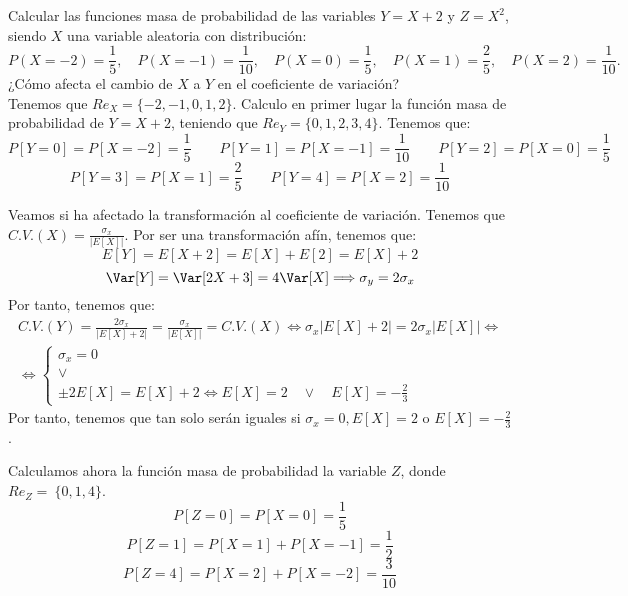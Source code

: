\begin{ejercicio}
    Calcular las funciones masa de probabilidad de las variables $Y = X + 2$ y $Z = X^2$, siendo $X$ una variable aleatoria con distribución:
    \begin{equation*}
        P(X=-2)=\frac{1}{5},\quad P(X=-1)=\frac{1}{10},\quad P(X=0)=\frac{1}{5}, \quad P(X=1)=\frac{2}{5}, \quad P(X=2)=\frac{1}{10}.
    \end{equation*}
    ¿Cómo afecta el cambio de $X$ a $Y$ en el coeficiente de variación?\\
    Tenemos que $Re_X=\{-2,-1,0,1,2\}$. Calculo en primer lugar la función masa de probabilidad de $Y=X+2$, teniendo que $Re_Y=\{0,1,2,3,4\}$. Tenemos que:
    \begin{equation*}
        P[Y=0]=P[X=-2]=\frac{1}{5}
        \qquad
        P[Y=1]=P[X=-1]=\frac{1}{10}
        \qquad
        P[Y=2]=P[X=0]=\frac{1}{5}
    \end{equation*}
    \begin{equation*}
        P[Y=3]=P[X=1]=\frac{2}{5}
        \qquad
        P[Y=4]=P[X=2]=\frac{1}{10}
    \end{equation*}

    Veamos si ha afectado la transformación al coeficiente de variación. Tenemos que $\displaystyle C.V.(X)=\frac{\sigma_x}{|E[X]|}$. Por ser una transformación afín, tenemos que:
    \begin{equation*}
       E[Y]=E[X+2]=E[X]+E[2]=E[X]+2
    \end{equation*}
    \begin{equation*}
        \Var[Y]=\Var[2X+3]=4\Var[X] \Longrightarrow \sigma_y = 2\sigma_x
    \end{equation*}
    Por tanto, tenemos que:
    \begin{multline*}
        C.V.(Y)=\frac{2\sigma_x}{|E[X]+2|} =\frac{\sigma_x}{|E[X]|}=C.V.(X)
        \Longleftrightarrow
        \sigma_x|E[X]+2| = 2\sigma_x|E[X]| \Longleftrightarrow \\ \Longleftrightarrow
        \left\{\begin{array}{c}
            \sigma_x=0 \\
             \lor \\
             \pm 2E[X]=E[X]+2 \Longleftrightarrow E[X]=2 \quad \lor \quad E[X]=-\frac{2}{3}
        \end{array}\right.
    \end{multline*}
    Por tanto, tenemos que tan solo serán iguales si $\sigma_x=0, E[X]=2$ o $E[X]=-\frac{2}{3}$.

    \vspace{1cm} Calculamos ahora la función masa de probabilidad la variable $Z$, donde $Re_Z=~\{0, 1, 4\}$.
    \begin{equation*}
        P[Z=0]=P[X=0]=\frac{1}{5}
    \end{equation*}
    \begin{equation*}
        P[Z=1]=P[X=1]+P[X=-1]=\frac{1}{2}
    \end{equation*}
    \begin{equation*}
        P[Z=4]=P[X=2]+P[X=-2]=\frac{3}{10}
    \end{equation*}
\end{ejercicio}

